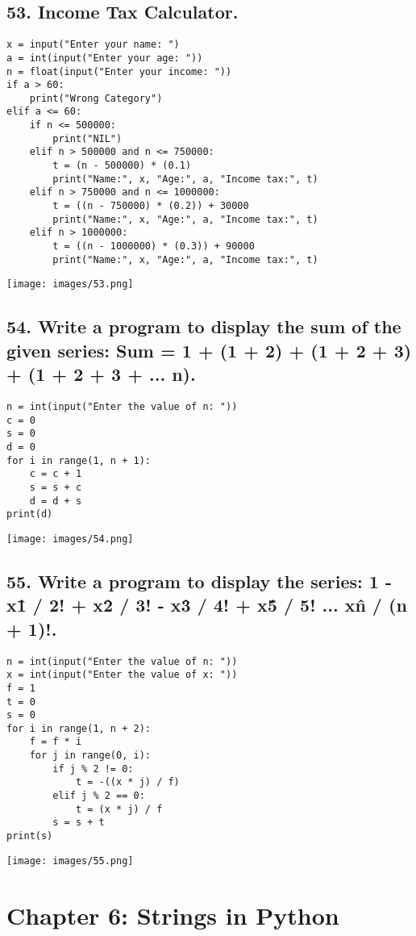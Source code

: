 \documentclass[12pt]{article}
\begin{document}
\subsection*{53. Income Tax Calculator.}
\begin{verbatim}
x = input("Enter your name: ")
a = int(input("Enter your age: "))
n = float(input("Enter your income: "))
if a > 60:
    print("Wrong Category")
elif a <= 60:
    if n <= 500000:
        print("NIL")
    elif n > 500000 and n <= 750000:
        t = (n - 500000) * (0.1)
        print("Name:", x, "Age:", a, "Income tax:", t)
    elif n > 750000 and n <= 1000000:
        t = ((n - 750000) * (0.2)) + 30000
        print("Name:", x, "Age:", a, "Income tax:", t)
    elif n > 1000000:
        t = ((n - 1000000) * (0.3)) + 90000
        print("Name:", x, "Age:", a, "Income tax:", t)
\end{verbatim}
\texttt{[image: images/53.png]}

\subsection*{54. Write a program to display the sum of the given series: Sum = 1 + (1 + 2) + (1 + 2 + 3) + (1 + 2 + 3 + ... n).}
\begin{verbatim}
n = int(input("Enter the value of n: "))
c = 0
s = 0
d = 0
for i in range(1, n + 1):
    c = c + 1
    s = s + c
    d = d + s
print(d)
\end{verbatim}
\texttt{[image: images/54.png]}

\subsection*{55. Write a program to display the series: 1 - x\^1 / 2! + x\^2 / 3! - x\^3 / 4! + x\^5 / 5! ... x\^n / (n + 1)!.}
\begin{verbatim}
n = int(input("Enter the value of n: "))
x = int(input("Enter the value of x: "))
f = 1
t = 0
s = 0
for i in range(1, n + 2):
    f = f * i
    for j in range(0, i):
        if j % 2 != 0:
            t = -((x * j) / f)
        elif j % 2 == 0:
            t = (x * j) / f
        s = s + t
print(s)
\end{verbatim}
\texttt{[image: images/55.png]}

\section*{Chapter 6: Strings in Python}
\end{document}
